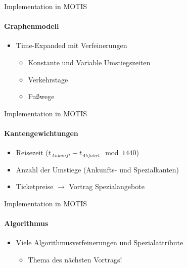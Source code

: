 \begin{frame}{Implementation in MOTIS}
	\framesubtitle{Graphenmodell}
	\begin{itemize}
		\item Time-Expanded mit Verfeinerungen
		\begin{itemize}
			\item Konstante und Variable Umstiegszeiten
			\item Verkehrstage
			\item Fußwege
		\end{itemize}
	\end{itemize}
\end{frame}

\begin{frame}{Implementation in MOTIS}
	\framesubtitle{Kantengewichtungen}

	\begin{itemize}
		\item Reisezeit ($t_{Ankunft} - t_{Abfahrt} \mod 1440$)
		\item Anzahl der Umstiege (Ankunfts- und Spezialkanten)
		\item Ticketpreise $\rightarrow$ Vortrag Spezialangebote
	\end{itemize}
\end{frame}


\begin{frame}{Implementation in MOTIS}
	\framesubtitle{Algorithmus}

	\begin{itemize}
		\item Viele Algorithmusverfeinerungen und Spezialattribute
		\begin{itemize}
			\item Thema des nächsten Vortrags!
		\end{itemize}
	\end{itemize}
\end{frame}